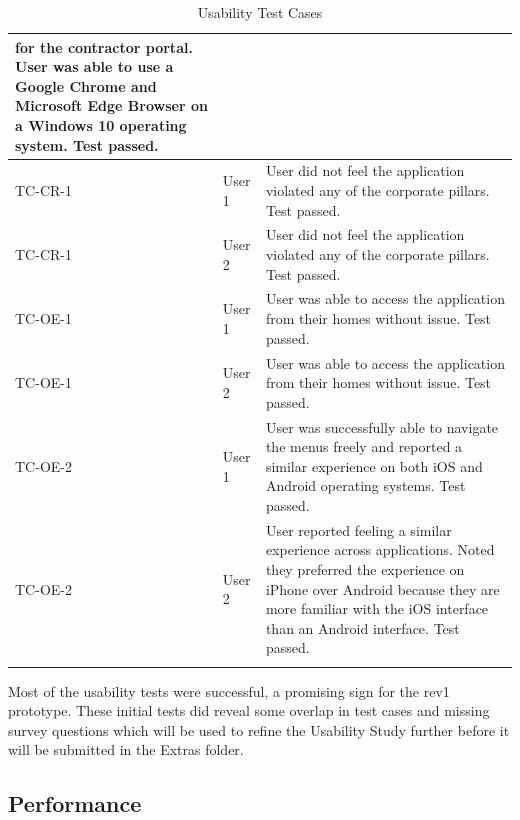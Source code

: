 \documentclass[12pt, titlepage]{article}
\begin{document}
\begin{longtable}{|m{2cm}|m{1.5cm}|m{9cm}|}
  for the contractor portal. User was able to use a Google Chrome and
  Microsoft Edge Browser on a Windows 10 operating system. Test passed.\\
  \hline
  TC-CR-1 & User 1& User did not feel the application violated any of
  the corporate pillars. Test passed.\\
  \hline
  TC-CR-1 & User 2& User did not feel the application violated any of
  the corporate pillars. Test passed.\\
  \hline
  TC-OE-1 & User 1 & User was able to access the application from
  their homes without issue. Test passed.\\
  \hline
  TC-OE-1 & User 2& User was able to access the application from
  their homes without issue. Test passed.\\
  \hline
  TC-OE-2 & User 1& User was successfully able to navigate the menus
  freely and reported a similar experience on both iOS
  and Android operating systems. Test passed.\\
  \hline
  TC-OE-2 & User 2& User reported feeling a similar experience across
  applications. Noted they preferred the experience on
  iPhone over Android because they are more familiar with the iOS
  interface than an Android interface. Test passed.\\
  \hline
  \caption{Usability Test Cases}
\end{longtable}
Most of the usability tests were successful, a promising sign for the
rev1 prototype. These initial tests did reveal some overlap in test cases
and missing survey questions which will be used to refine the
Usability Study further before it will be submitted in the Extras folder.

\subsection{Performance}
\end{document}
